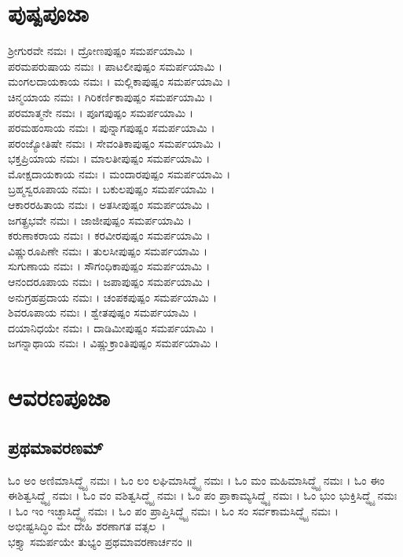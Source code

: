 \section{ಪುಷ್ಪಪೂಜಾ}
ಶ್ರೀಗುರವೇ ನಮಃ । ದ್ರೋಣಪುಷ್ಪಂ ಸಮರ್ಪಯಾಮಿ ।\\
ಪರಮಪರುಷಾಯ ನಮಃ । ಪಾಟಲೀಪುಷ್ಪಂ ಸಮರ್ಪಯಾಮಿ ।\\
ಮಂಗಲದಾಯಕಾಯ ನಮಃ । ಮಲ್ಲಿಕಾಪುಷ್ಪಂ ಸಮರ್ಪಯಾಮಿ ।\\
ಚಿನ್ಮಯಾಯ ನಮಃ । ಗಿರಿಕರ್ಣಿಕಾಪುಷ್ಪಂ ಸಮರ್ಪಯಾಮಿ ।\\
ಪರಮಾತ್ಮನೇ ನಮಃ । ಪೂಗಪುಷ್ಪಂ ಸಮರ್ಪಯಾಮಿ ।\\
ಪರಮಹಂಸಾಯ ನಮಃ । ಪುನ್ನಾಗಪುಷ್ಪಂ ಸಮರ್ಪಯಾಮಿ ।\\
ಪರಂಜ್ಯೋತಿಷೇ ನಮಃ । ಸೇವಂತಿಕಾಪುಷ್ಪಂ ಸಮರ್ಪಯಾಮಿ ।\\
ಭಕ್ತಪ್ರಿಯಾಯ ನಮಃ । ಮಾಲತೀಪುಷ್ಪಂ ಸಮರ್ಪಯಾಮಿ ।\\
ಮೋಕ್ಷದಾಯಕಾಯ ನಮಃ । ಮಂದಾರಪುಷ್ಪಂ ಸಮರ್ಪಯಾಮಿ ।\\
ಬ್ರಹ್ಮಸ್ವರೂಪಾಯ ನಮಃ । ಬಕುಲಪುಷ್ಪಂ ಸಮರ್ಪಯಾಮಿ ।\\
ಆಕಾರರಹಿತಾಯ ನಮಃ । ಅತಸೀಪುಷ್ಪಂ ಸಮರ್ಪಯಾಮಿ ।\\
ಜಗತ್ಪ್ರಭವೇ ನಮಃ । ಜಾಜೀಪುಷ್ಪಂ ಸಮರ್ಪಯಾಮಿ ।\\
ಕರುಣಾಕರಾಯ ನಮಃ । ಕರವೀರಪುಷ್ಪಂ ಸಮರ್ಪಯಾಮಿ ।\\
ವಿಷ್ಣುರೂಪಿಣೇ ನಮಃ । ತುಲಸೀಪುಷ್ಪಂ ಸಮರ್ಪಯಾಮಿ ।\\
ಸುಗುಣಾಯ ನಮಃ । ಸೌಗಂಧಿಕಾಪುಷ್ಪಂ ಸಮರ್ಪಯಾಮಿ ।\\
ಆನಂದರೂಪಾಯ ನಮಃ । ಜಪಾಪುಷ್ಪಂ ಸಮರ್ಪಯಾಮಿ ।\\
ಅನುಗ್ರಹಪ್ರದಾಯ ನಮಃ । ಚಂಪಕಪುಷ್ಪಂ ಸಮರ್ಪಯಾಮಿ ।\\
ಶಿವರೂಪಾಯ ನಮಃ । ಶ್ವೇತಪುಷ್ಪಂ ಸಮರ್ಪಯಾಮಿ ।\\
ದಯಾನಿಧಯೇ ನಮಃ । ದಾಡಿಮೀಪುಷ್ಪಂ ಸಮರ್ಪಯಾಮಿ ।\\
ಜಗನ್ನಾಥಾಯ ನಮಃ । ವಿಷ್ಣುಕ್ರಾಂತಿಪುಷ್ಪಂ ಸಮರ್ಪಯಾಮಿ ।
\newpage
\section{ಆವರಣಪೂಜಾ}
\subsection{ಪ್ರಥಮಾವರಣಮ್}
ಓಂ ಅಂ ಅಣಿಮಾಸಿದ್ಧ್ಯೈ ನಮಃ ।
ಓಂ ಲಂ ಲಘಿಮಾಸಿದ್ಧ್ಯೈ ನಮಃ ।
ಓಂ ಮಂ ಮಹಿಮಾಸಿದ್ಧ್ಯೈ ನಮಃ ।
ಓಂ ಈಂ ಈಶಿತ್ವಸಿದ್ಧ್ಯೈ ನಮಃ ।
ಓಂ ವಂ ವಶಿತ್ವಸಿದ್ಧ್ಯೈ ನಮಃ ।
ಓಂ ಪಂ ಪ್ರಾಕಾಮ್ಯಸಿದ್ಧ್ಯೈ ನಮಃ ।
ಓಂ ಭುಂ ಭುಕ್ತಿಸಿದ್ಧ್ಯೈ ನಮಃ ।
ಓಂ ಇಂ ಇಚ್ಛಾಸಿದ್ಧ್ಯೈ ನಮಃ ।
ಓಂ ಪಂ ಪ್ರಾಪ್ತಿಸಿದ್ಧ್ಯೈ ನಮಃ ।
ಓಂ ಸಂ ಸರ್ವಕಾಮಸಿದ್ಧ್ಯೈ ನಮಃ ।\\
ಅಭೀಷ್ಟಸಿದ್ಧಿಂ ಮೇ ದೇಹಿ ಶರಣಾಗತ ವತ್ಸಲ~।\\
ಭಕ್ತ್ಯಾ ಸಮರ್ಪಯೇ ತುಭ್ಯಂ ಪ್ರಥಮಾವರಣಾರ್ಚನಂ ॥

